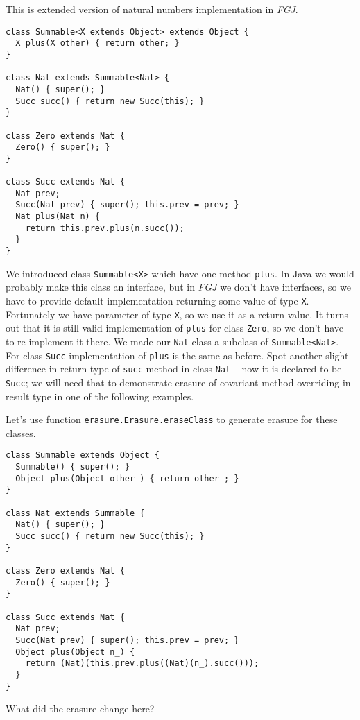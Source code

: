 \documentclass{article}[12pt]
\begin{document}
This is extended version of natural numbers implementation in
\emph{FGJ}.

\begin{verbatim}
class Summable<X extends Object> extends Object {
  X plus(X other) { return other; }
}

class Nat extends Summable<Nat> {
  Nat() { super(); }
  Succ succ() { return new Succ(this); }
}

class Zero extends Nat { 
  Zero() { super(); }
}

class Succ extends Nat {
  Nat prev;
  Succ(Nat prev) { super(); this.prev = prev; }
  Nat plus(Nat n) {
    return this.prev.plus(n.succ());
  }
}
\end{verbatim}

We introduced class \texttt{Summable<X>} which have one method
\texttt{plus}. In Java we would probably make this class an
interface, but in \emph{FGJ} we don't have interfaces, so we have
to provide default implementation returning some value of type
\texttt{X}. Fortunately we have parameter of type \texttt{X},
so we use it as a return value. It turns out that it is still
valid implementation of \texttt{plus} for class \texttt{Zero},
so we don't have to re-implement it there. We made our
\texttt{Nat} class a subclass of \texttt{Summable<Nat>}. For
class \texttt{Succ} implementation of \texttt{plus} is the same
as before. Spot another slight difference in return type
of \texttt{succ} method in class \texttt{Nat} -- now it is
declared to be \texttt{Succ}; we will need that to demonstrate
erasure of covariant method overriding in result type in one of
the following examples.

Let's use function \texttt{erasure.Erasure.eraseClass} to generate
erasure for these classes.

\begin{verbatim}
class Summable extends Object {
  Summable() { super(); }
  Object plus(Object other_) { return other_; }
}

class Nat extends Summable {
  Nat() { super(); }
  Succ succ() { return new Succ(this); }
}

class Zero extends Nat { 
  Zero() { super(); }
}

class Succ extends Nat {
  Nat prev;
  Succ(Nat prev) { super(); this.prev = prev; }
  Object plus(Object n_) {
    return (Nat)(this.prev.plus((Nat)(n_).succ())); 
  }
}
\end{verbatim}
What did the erasure change here?
\end{document}
